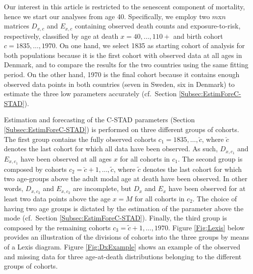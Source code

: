 \documentclass[11pt, a4paper]{article}
\begin{document}
Our interest in this article is restricted to the senescent component of mortality, hence we start our analyses from age 40. Specifically, we employ two $m$x$n$ matrices $D_{x,c}$ and $E_{x,c}$ containing observed death counts and exposure-to-risk, respectively, classified by age at death $x=40,\ldots, 110+$ and birth cohort $c=1835,\ldots,1970$. On one hand, we select 1835 as starting cohort of analysis for both populations because it is the first cohort with observed data at all ages in Denmark, and to compare the results for the two countries using the same fitting period. On the other hand, 1970 is the final cohort because it contains enough observed data points in both countries (seven in Sweden, six in Denmark) to estimate the three low parameters accurately (cf.~Section \ref{Subsec:EstimForeC-STAD}).

Estimation and forecasting of the C-STAD parameters (Section \ref{Subsec:EstimForeC-STAD}) is performed on three different groups of cohorts. The first group contains the fully observed cohorts $c_1 =1835,\ldots,\breve{c}$, where $\breve{c}$ denotes the last cohort for which all data have been observed. As such, $D_{x,c_1}$ and $E_{x,c_1}$ have been observed at all ages $x$ for all cohorts in $c_1$. The second group is composed by cohorts $c_2 =\breve{c}+1, \ldots, \tilde{c}$, where $\tilde{c}$ denotes the last cohort for which two age-groups above the adult modal age at death have been observed. In other words, $D_{x,c_2}$ and $E_{x,c_2}$ are incomplete, but $D_x$ and $E_x$ have been observed for at least two data points above the age $x=M$ for all cohorts in $c_2$. The choice of having two age groups is dictated by the estimation of the parameter above the mode (cf.~Section \ref{Subsec:EstimForeC-STAD}). Finally, the third group is composed by the remaining cohorts $c_3 =\tilde{c}+1, \ldots, 1970$. Figure \ref{Fig:Lexis} below provides an illustration of the divisions of cohorts into the three groups by means of a Lexis diagram. Figure \ref{Fig:DxExample} shows an example of the observed and missing data for three age-at-death distributions belonging to the different groups of cohorts. 
\end{document}
